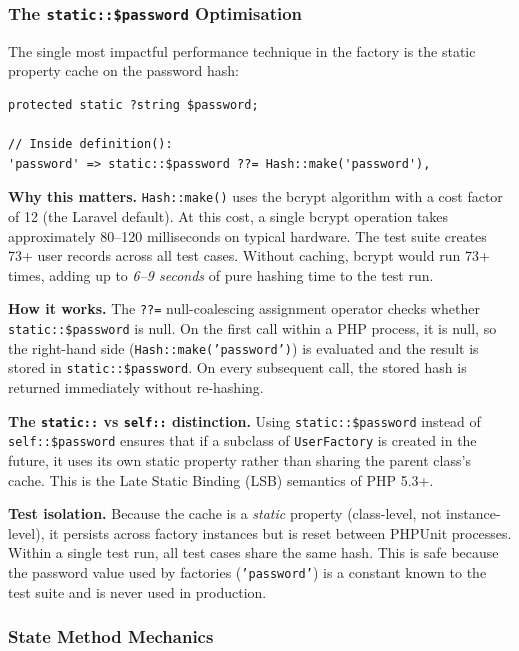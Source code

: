 \subsubsection{The \texttt{static::\$password} Optimisation}

The single most impactful performance technique in the factory is the
static property cache on the password hash:

\begin{lstlisting}[style=php, caption={Password hash memoisation.}, label={lst:pw-cache}]
protected static ?string $password;

// Inside definition():
'password' => static::$password ??= Hash::make('password'),
\end{lstlisting}

\textbf{Why this matters.} \texttt{Hash::make()} uses the bcrypt
algorithm with a cost factor of 12 (the Laravel default). At this cost,
a single bcrypt operation takes approximately 80--120 milliseconds on
typical hardware. The test suite creates 73+ user records across all
test cases. Without caching, bcrypt would run 73+ times, adding up to
\emph{6--9 seconds} of pure hashing time to the test run.

\textbf{How it works.} The \texttt{??=} null-coalescing assignment
operator checks whether \texttt{static::\$password} is null. On the
first call within a PHP process, it is null, so the right-hand side
(\texttt{Hash::make('password')}) is evaluated and the result is stored
in \texttt{static::\$password}. On every subsequent call, the
stored hash is returned immediately without re-hashing.

\textbf{The \texttt{static::} vs \texttt{self::} distinction.} Using
\texttt{static::\$password} instead of \texttt{self::\$password} ensures
that if a subclass of \texttt{UserFactory} is created in the future, it
uses its own static property rather than sharing the parent class's cache.
This is the Late Static Binding (LSB) semantics of PHP 5.3+.

\textbf{Test isolation.} Because the cache is a \emph{static} property
(class-level, not instance-level), it persists across factory instances
but is reset between PHPUnit processes. Within a single test run, all
test cases share the same hash. This is safe because the password value
used by factories (\texttt{'password'}) is a constant known to the
test suite and is never used in production.

\subsubsection{State Method Mechanics}


